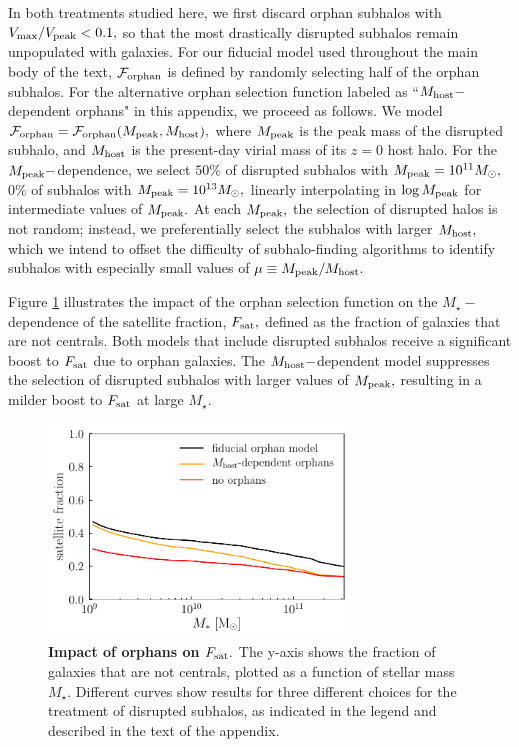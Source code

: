 \documentclass[usenatbib,usegraphicx,letterpaper]{mn2e}
\newcommand{\mstar}{M_{\star}}
\newcommand{\fsat}{F_{\rm sat}}
\newcommand{\mpeak}{M_{\rm peak}}
\newcommand{\mhost}{M_{\rm host}}
\newcommand{\msun}{M_\odot}
\begin{document}
In both treatments studied here, we first discard orphan subhalos with $V_{\rm max}/V_{\rm peak}<0.1,$ so that the most drastically disrupted subhalos remain unpopulated with galaxies. For our fiducial model used throughout the main body of the text, $\mathcal{F}_{\rm orphan}$ is defined by randomly selecting half of the orphan subhalos. For the alternative orphan selection function labeled as ``$M_{\rm host}-$dependent orphans" in this appendix, we proceed as follows. We model $\mathcal{F}_{\rm orphan}=\mathcal{F}_{\rm orphan}(M_{\rm peak},M_{\rm host}),$ where $\mpeak$ is the peak mass of the disrupted subhalo, and $\mhost$ is the present-day virial mass of its $z=0$ host halo. For the $\mpeak-$dependence, we select $50\%$ of disrupted subhalos with $\mpeak=10^{11}\msun,$ $0\%$ of subhalos with $\mpeak=10^{13}\msun,$ linearly interpolating in $\log\mpeak$ for intermediate values of $\mpeak.$ At each $\mpeak,$ the selection of disrupted halos is not random; instead, we preferentially select the subhalos with larger $\mhost,$ which we intend to offset the difficulty of subhalo-finding algorithms to identify subhalos with especially small values of  $\mu\equiv\mpeak/\mhost.$

Figure \ref{fig:orphan_satellite_fractions} illustrates the impact of the orphan selection function on the $\mstar-$dependence of the satellite fraction, $\fsat,$ defined as the fraction of galaxies that are not centrals. Both models that include disrupted subhalos receive a significant boost to $\fsat$ due to orphan galaxies. The $\mhost-$dependent model suppresses the selection of disrupted subhalos with larger values of $\mpeak,$ resulting in a milder boost to $\fsat$ at large $\mstar.$

\begin{figure}
\centering
\includegraphics[width=8cm]{FIGS/orphan_satellite_fraction.pdf}
\caption{
{\bf Impact of orphans on $\fsat.$} The y-axis shows the fraction of galaxies that are not centrals, plotted as a function of stellar mass $\mstar.$ Different curves show results for three different choices for the treatment of disrupted subhalos, as indicated in the legend and described in the text of the appendix.
}
\label{fig:orphan_satellite_fractions}
\end{figure}
\end{document}
